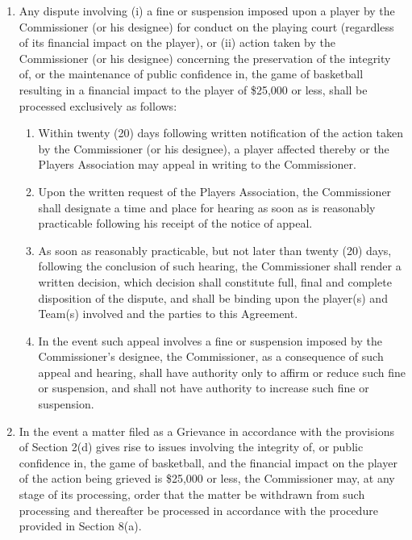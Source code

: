 \documentclass[
]{book}
\providecommand{\tightlist}{%
  \setlength{\itemsep}{0pt}\setlength{\parskip}{0pt}}
\begin{document}
\begin{enumerate}
\def\labelenumi{(\alph{enumi})}
\tightlist
\item
  Any dispute involving (i) a fine or suspension imposed upon a player by the Commissioner (or his designee) for conduct on the playing court (regardless of its financial impact on the player), or (ii) action taken by the Commissioner (or his designee) concerning the preservation of the integrity of, or the maintenance of public confidence in, the game of basketball resulting in a financial impact to the player of \$25,000 or less, shall be processed exclusively as follows:

  \begin{enumerate}
  \def\labelenumii{(\roman{enumii})}
  \tightlist
  \item
    Within twenty (20) days following written notification of the action taken by the Commissioner (or his designee), a player affected thereby or the Players Association may appeal in writing to the Commissioner.
  \item
    Upon the written request of the Players Association, the Commissioner shall designate a time and place for hearing as soon as is reasonably practicable following his receipt of the notice of appeal.
  \item
    As soon as reasonably practicable, but not later than twenty (20) days, following the conclusion of such hearing, the Commissioner shall render a written decision, which decision shall constitute full, final and complete disposition of the dispute, and shall be binding upon the player(s) and Team(s) involved and the parties to this Agreement.
  \item
    In the event such appeal involves a fine or suspension imposed by the Commissioner's designee, the Commissioner, as a consequence of such appeal and hearing, shall have authority only to affirm or reduce such fine or suspension, and shall not have authority to increase such fine or suspension.
  \end{enumerate}
\item
  In the event a matter filed as a Grievance in accordance with the provisions of Section 2(d) gives rise to issues involving the integrity of, or public confidence in, the game of basketball, and the financial impact on the player of the action being grieved is \$25,000 or less, the Commissioner may, at any stage of its processing, order that the matter be withdrawn from such processing and thereafter be processed in accordance with the procedure provided in Section 8(a).
\end{enumerate}
\end{document}

